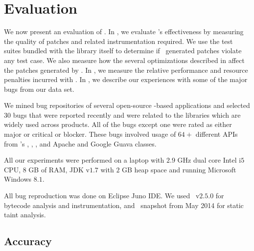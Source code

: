 \section{Evaluation}
\label{sec:results}

We now present an evaluation of \tool. In , we evaluate
\tool's effectiveness by measuring the quality of patches and related
instrumentation required. We use the test suites bundled with the library itself
to determine if \tool\ generated patches violate any test case. We also measure
how the several optimizations described in  affect
the patches generated by \tool. In , we measure the relative
performance and resource penalties incurred with \tool. In
, we describe our experiences with some of the major bugs
from our data set.


 We mined bug repositories of several open-source
\java-based applications and selected $30$ bugs that were reported recently
and were related to the libraries which are widely used across products. All of the
bugs except one were rated as either major or critical or blocker.
These bugs involved usage of $64+$ different APIs from
\java's , , , and Apache
 and Google Guava  classes.

 All our experiments were performed on a laptop
with $2.9$ GHz dual core Intel i$5$ CPU, $8$ GB of RAM, JDK v$1.7$ with $2$
GB heap space and running Microsoft Windows $8.1$. All bug reproduction was done on
Eclipse Juno IDE. We used \soot\ v$2.5.0$ for bytecode analysis and
instrumentation, and \infoflow\ snapshot from May 2014 for static taint
analysis.

\subsection{Accuracy}
\label{sub:accuracy}

